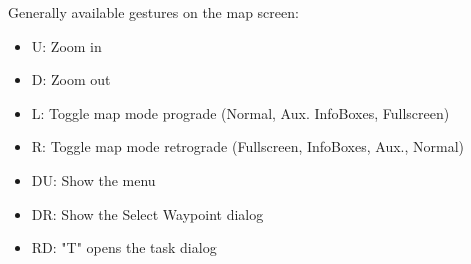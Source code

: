 Generally available gestures on the map screen:
\begin{itemize}
\item U: Zoom in
\item D: Zoom out
\item L: Toggle map mode prograde (Normal, Aux. InfoBoxes, Fullscreen)
\item R: Toggle map mode retrograde (Fullscreen, InfoBoxes, Aux., Normal)
\item DU: Show the menu
\item DR: Show the Select Waypoint dialog
\item RD: "T" opens the task dialog
\end{itemize}

